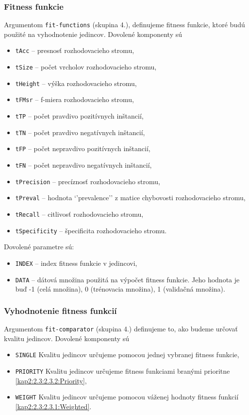 \subsubsection*{Fitness funkcie}
Argumentom \verb|fit-functions| (skupina 4.), definujeme fitness funkcie, ktoré budú použité na vyhodnotenie jedincov.
Dovolené komponenty sú 
\begin{itemize}
\item \verb|tAcc| -- presnosť rozhodovacieho stromu,
\item \verb|tSize|  -- počet vrcholov rozhodovacieho stromu,
\item \verb|tHeight| -- výška rozhodovacieho stromu,
\item \verb|tFMsr| -- f-miera rozhodovacieho stromu,
\item \verb|tTP| -- počet pravdivo pozitívnych inštancií,
\item \verb|tTN| -- počet pravdivo negatívnych inštancií,
\item \verb|tFP| -- počet nepravdivo pozitívnych inštancií,
\item \verb|tFN| -- počet nepravdivo negatívnych inštancií,
\item \verb|tPrecision| -- precíznosť rozhodovacieho stromu,
\item \verb|tPreval| -- hodnota `'prevalence'' z matice chybovosti rozhodovacieho stromu,
\item \verb|tRecall| -- citlivosť rozhodovacieho stromu,
\item \verb|tSpecificity| -- špecificita rozhodovacieho stromu.
\end{itemize}

Dovolené parametre sú:
\begin{itemize}
\item \verb|INDEX| -- index fitness funkcie v jedincovi,
\item \verb|DATA| -- dátová množina použitá na výpočet fitness funkcie. Jeho hodnota je buď -1 (celá množina), 0 (trénovacia množina), 1 (validačná množina).
\end{itemize}

\subsubsection*{Vyhodnotenie fitness funkcií}
Argumentom \verb|fit-comparator| (skupina 4.) definujeme to, ako budeme určovať kvalitu jedincov.
Dovolené komponenty sú 
\begin{itemize}
\item \verb|SINGLE| Kvalitu jedincov určujeme pomocou jednej vybranej fitness funkcie,
\item \verb|PRIORITY| Kvalitu jedincov určujeme fitness funkciami branými prioritne \ref{kap2:2.3:2.3.2:Priority},
\item \verb|WEIGHT| Kvalitu jedincov určujeme pomocou váženej hodnoty fitness funkcií \ref{kap2:2.3:2.3.1:Weighted}.
\end{itemize}

